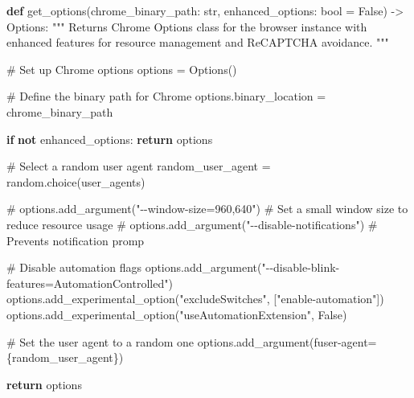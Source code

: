 \documentclass[
  titlepage]{article}
\newenvironment{Shaded}{\begin{snugshade}}{\end{snugshade}}
\newcommand{\BuiltInTok}[1]{\textcolor[rgb]{0.00,0.23,0.31}{#1}}
\newcommand{\CommentTok}[1]{\textcolor[rgb]{0.37,0.37,0.37}{#1}}
\newcommand{\ControlFlowTok}[1]{\textcolor[rgb]{0.00,0.23,0.31}{\textbf{#1}}}
\newcommand{\KeywordTok}[1]{\textcolor[rgb]{0.00,0.23,0.31}{\textbf{#1}}}
\newcommand{\NormalTok}[1]{\textcolor[rgb]{0.00,0.23,0.31}{#1}}
\newcommand{\OperatorTok}[1]{\textcolor[rgb]{0.37,0.37,0.37}{#1}}
\newcommand{\SpecialCharTok}[1]{\textcolor[rgb]{0.37,0.37,0.37}{#1}}
\newcommand{\SpecialStringTok}[1]{\textcolor[rgb]{0.13,0.47,0.30}{#1}}
\newcommand{\StringTok}[1]{\textcolor[rgb]{0.13,0.47,0.30}{#1}}
\newcommand{\VariableTok}[1]{\textcolor[rgb]{0.07,0.07,0.07}{#1}}
\begin{document}
\begin{Shaded}
\begin{Highlighting}[]
\KeywordTok{def}\NormalTok{ get\_options(chrome\_binary\_path: }\BuiltInTok{str}\NormalTok{, enhanced\_options: }\BuiltInTok{bool} \OperatorTok{=} \VariableTok{False}\NormalTok{) }\OperatorTok{{-}\textgreater{}}\NormalTok{ Options:}
    \CommentTok{"""}
\CommentTok{    Returns Chrome Options class for the browser instance with enhanced }
\CommentTok{    features for resource management and ReCAPTCHA avoidance.}
\CommentTok{    """}
    
    \CommentTok{\# Set up Chrome options}
\NormalTok{    options }\OperatorTok{=}\NormalTok{ Options()}

    \CommentTok{\# Define the binary path for Chrome}
\NormalTok{    options.binary\_location }\OperatorTok{=}\NormalTok{ chrome\_binary\_path}

    \ControlFlowTok{if} \KeywordTok{not}\NormalTok{ enhanced\_options:}
        \ControlFlowTok{return}\NormalTok{ options}
    
    \CommentTok{\# Select a random user agent}
\NormalTok{    random\_user\_agent }\OperatorTok{=}\NormalTok{ random.choice(user\_agents)}

    \CommentTok{\# options.add\_argument("{-}{-}window{-}size=960,640") \# Set a small window size to reduce resource usage}
    \CommentTok{\# options.add\_argument("{-}{-}disable{-}notifications")  \# Prevents notification promp}

    \CommentTok{\# Disable automation flags}
\NormalTok{    options.add\_argument(}\StringTok{"{-}{-}disable{-}blink{-}features=AutomationControlled"}\NormalTok{)}
\NormalTok{    options.add\_experimental\_option(}\StringTok{"excludeSwitches"}\NormalTok{, [}\StringTok{"enable{-}automation"}\NormalTok{])}
\NormalTok{    options.add\_experimental\_option(}\StringTok{"useAutomationExtension"}\NormalTok{, }\VariableTok{False}\NormalTok{)}

    \CommentTok{\# Set the user agent to a random one}
\NormalTok{    options.add\_argument(}\SpecialStringTok{f\textquotesingle{}user{-}agent=}\SpecialCharTok{\{}\NormalTok{random\_user\_agent}\SpecialCharTok{\}}\SpecialStringTok{\textquotesingle{}}\NormalTok{)}

    \ControlFlowTok{return}\NormalTok{ options}
\end{Highlighting}
\end{Shaded}
\end{document}
